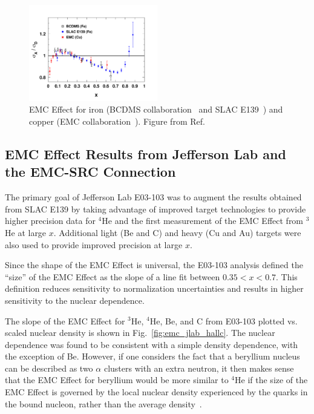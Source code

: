 \begin{figure}[htb]
  \includegraphics[width=0.5\textwidth]{plots/emc_cu_fe.pdf}
  \caption{EMC Effect for iron (BCDMS collaboration~\cite{Benvenuti:1987az} and SLAC E139~\cite{Gomez:1993ri})
    and copper (EMC collaboration~\cite{Ashman:1992kv}).
    Figure from Ref.~\cite{Guzey:2012yk}}
  \label{fig:emc_iron}
\end{figure}

\subsection{EMC Effect Results from Jefferson Lab and the EMC-SRC Connection}

The primary goal of Jefferson Lab E03-103 was to augment the results obtained from SLAC E139 by taking
advantage of improved target technologies to provide higher precision data for $^4$He and the first
measurement of the EMC Effect from $^3$He at large $x$.  Additional light (Be and C) and heavy (Cu and Au)
targets were also used to provide improved precision at large $x$.

Since the shape of the EMC Effect is universal, the E03-103 analysis defined the ``size'' of the EMC
Effect as the slope of a line fit between $0.35<x<0.7$.  This definition reduces sensitivity to
normalization uncertainties and results in higher sensitivity to the nuclear dependence.

The slope of the EMC Effect for $^3$He, $^4$He, Be, and C from E03-103 plotted vs. scaled nuclear
density is shown in Fig.~\ref{fig:emc_jlab_hallc}.  The nuclear dependence was found to be consistent
with a simple density dependence, with the exception of Be. However, if one considers the fact that a
beryllium nucleus can be described as two $\alpha$ clusters with an extra neutron, it then makes sense
that the EMC Effect for beryllium would be more similar to $^4$He if the size of the EMC Effect is
governed by the local nuclear density experienced by the quarks in the bound nucleon, rather than the
average density~\cite{Seely:2009gt}.

